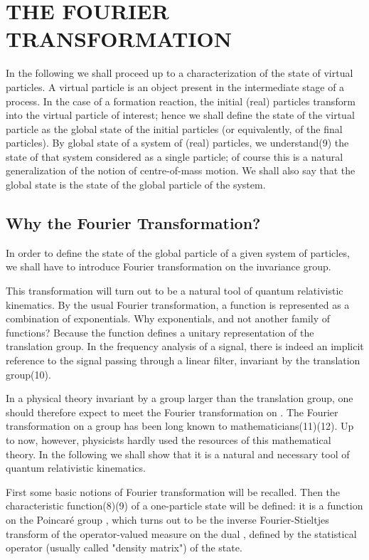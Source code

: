 \documentclass[a4paper,11pt]{article}
\begin{document}
\section{THE FOURIER TRANSFORMATION}

In the following we shall proceed up to a characterization of the state of virtual particles. A 
virtual particle is an object present in the intermediate stage of a process. In the case of a 
formation reaction, the initial (real) particles transform into the virtual particle of 
interest; hence we shall define the state of the virtual particle as the global state of the 
initial particles (or equivalently, of the final particles). By global state of a system of 
(real) particles, we understand(9) the state of that system considered as a single particle; of 
course this is a natural generalization of the notion of centre-of-mass motion. We shall also 
say that the global state is the state of the global particle of the system.

\subsection{Why the Fourier Transformation?}

In order to define the state of the global particle of a given system of particles, we shall 
have to introduce Fourier transformation on the invariance group.

 This transformation will turn out to be a natural tool of quantum relativistic kinematics. By 
the usual Fourier transformation, a function is represented as a combination of exponentials. 
Why exponentials, and not another family of functions? Because the function \coordHE{} 
defines a unitary representation of the translation group. In the frequency analysis of a 
signal, there is indeed an implicit reference to the signal passing through a linear filter, 
invariant by the translation group(10).

In a physical theory invariant by a group \coordHE{} larger than the translation group, one should 
therefore expect to meet the Fourier transformation on \coordHE{}. The Fourier transformation on a 
group has been long known to mathematicians(11)(12). Up to now, however, physicists hardly used 
the resources of this mathematical theory. In the following we shall show that it is a natural 
and necessary tool of quantum relativistic kinematics.

First some basic notions of Fourier transformation will be recalled. Then the characteristic 
function(8)(9) of a one-particle state will be defined: it is a function on the Poincar\'e  group 
\coordHE{}, which turns out to be the inverse Fourier-Stieltjes transform of the operator-valued 
measure on the dual \myHighlight{$\Pc$}\coordHE{}, defined by the statistical operator (usually called "density 
matrix") of the state.
\end{document}
